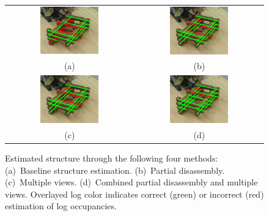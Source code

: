 \begin{figure}
  \centering
  \begin{tabular}{@{}c@{\hspace*{2pt}}c@{}}
    \includegraphics[width=0.48\textwidth]{images/cropped-1263242028-1800-a}&
    \includegraphics[width=0.48\textwidth]{images/cropped-1263242028-1800-b}\\
    (a)&(b)\\[1ex]
    \includegraphics[width=0.48\textwidth]{images/cropped-1263242028-1800-c}&
    \includegraphics[width=0.48\textwidth]{images/cropped-1263242028-1800-d}\\
    (c)&(d)
  \end{tabular}
  \caption{\small Estimated structure through the following four methods:
    (a)~Baseline structure estimation.
    (b)~Partial disassembly.
    (c)~Multiple views.
    (d)~Combined partial disassembly and multiple views.
    Overlayed log color indicates correct (green) or incorrect (red)
    estimation of log occupancies.}
  \label{fig:results}
  \par\vspace*{-3ex}
\end{figure}

